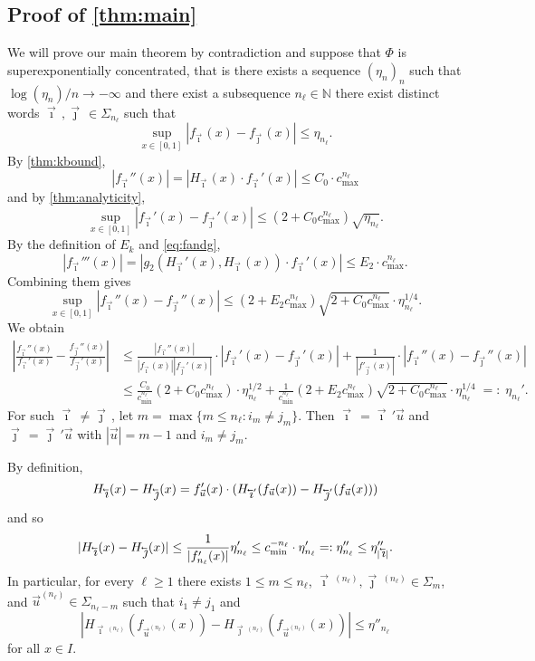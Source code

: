 \documentclass[12pt,]{article}
\theoremstyle{definition}
\theoremstyle{remark}
\renewcommand{\Bbb}[1]{\mathbb{#1}}
\newcommand{\bbN}{{\Bbb N}}         %
\newcommand{\0}{\mathbf{0}}
\newcommand{\cev}[1]{\reflectbox{\ensuremath{\vec{\reflectbox{\ensuremath{#1}}}}}}
\newcommand{\bi}{\vec{\imath}\,}
\newcommand{\bj}{\vec{\jmath}\,}
\newcommand{\bu}{{\vec{u}}}
\newcommand{\bbi}{\,\cev{\imath}}
\newcommand{\bbj}{\,\cev{\jmath}}
\begin{document}
\subsection{Proof of \texorpdfstring{\cref{thm:main}}{Main Theorem}}
We will prove our main theorem by contradiction and suppose that $\Phi$ is superexponentially
concentrated, that is there exists a sequence
$(\eta_n)_n$ such that $\log(\eta_n)/n\to-\infty$ and there exist a subsequence $n_{\ell}\in\bbN$ there exist distinct
words $\bi,\bj\in\Sigma_{n_\ell}$ such that
\[
  \sup_{x\in[0,1]}|f_{\bi}(x)-f_{\bj}(x)| \leq \eta_{n_\ell}.
\]
By \cref{thm:kbound},
\[
  |f_{\bi}''(x)| = |H_{\bi}(x)\cdot f_{\bi}'(x)|\leq C_0 \cdot c_{\max}^{n_\ell}
\]
and by \cref{thm:analyticity},
\[
  \sup_{x\in[0,1]}|f_{\bi}'(x) - f_{\bj}'(x)| \leq (2+C_0 c_{\max}^{n_\ell})\sqrt{\eta_{n_\ell}}.
\]
By the definition of $E_k$ and \cref{eq:fandg},
\[
  |f_{\bi}'''(x)| = |g_2(H_{\bi}'(x),H_{\bi}(x))\cdot f_{\bi}'(x)| \leq E_2\cdot c_{\max}^{n_\ell}.
\]
Combining them gives
\[
  \sup_{x\in[0,1]}|f_{\bi}''(x) - f_{\bj}''(x)| \leq (2+E_2c_{\max}^{n_\ell})\sqrt{2+C_0
  c_{\max}^{n_\ell}}\cdot
  \eta_{n_\ell}^{1/4}.
\]
We obtain
\begin{align*}
  \left|\frac{f_{\bi}''(x)}{f_{\bi}'(x)} - \frac{f_{\bj}''(x)}{f_{\bj}'(x)}\right|
    &\leq
    \frac{|f_{\bi}''(x)|}{|f_{\bi}(x)||f_{\bj}'(x)|}\cdot|f_{\bi}'(x) - f_{\bj}'(x)|
    +\frac{1}{|f'_{\bj}(x)|} \cdot |f_{\bi}''(x) - f_{\bj}''(x)|
    \\
    &
    \leq \frac{C_0}{c_{\min}^{n_\ell}}(2+C_0c_{\max}^{n_\ell})\cdot \eta_{n_\ell}^{1/2}
    +\frac{1}{c_{\min}^{n_\ell}}(2+E_2
    c_{\max}^{n_\ell})\sqrt{2+C_0 c_{\max}^{n_\ell}} \cdot \eta_{n_\ell}^{1/4} \;=:\;\eta_{n_\ell}'.
\end{align*}
For such $\bi\neq\bj$, let $m = \max\{m\leq {n_\ell} : i_m \neq j_m\}$. Then $\bi = \bi'\bu$ and $\bj =
\bj'\bu$ with $|\bu| = m-1$ and $i_m\neq j_m$.

By definition,
\[
  H_{\bbi}(x) - H_{\bbj}(x) = f_{\bu}'(x)\cdot (H_{\bbi'}(f_{\bu}(x)) - H_{\bbj'}(f_{\bu}(x)))
\]
and so
\[
  |H_{\bbi}(x) - H_{\bbj}(x)| \leq \frac{1}{|f'_{n_\ell}(x)|} \eta_{n_\ell}' \leq c_{\min}^{-{n_\ell}}
  \cdot \eta_{n_\ell}'
  =:\eta_{n_\ell}'' \leq \eta''_{|\bbi|}.
\]
In particular, for every $\ell\geq 1$ there exists $1\leq m\leq n_\ell$, $\bi^{(n_\ell)},\bj^{(n_\ell)}\in\Sigma_m$,
and $\bu^{(n_\ell)}\in\Sigma_{n_\ell-m}$ such that $i_1 \neq j_1$ and
\[
  |H_{\bi^{(n_\ell)}}(f_{\bu^{(n_\ell)}}(x)) - H_{\bj^{(n_\ell)}}(f_{\bu^{(n_\ell)}}(x))| \leq \eta''_{n_\ell}
\]
for all $x\in I$.
\end{document}

